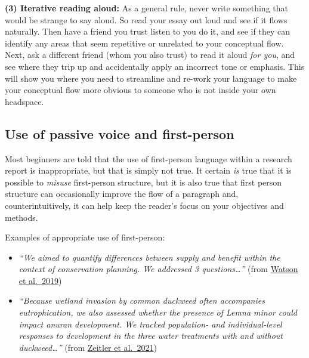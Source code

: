 \documentclass[
]{book}
\begin{document}
\textbf{(3) Iterative reading aloud:} As a general rule, never write something that would be strange to say aloud. So read your essay out loud and see if it flows naturally. Then have a friend you trust listen to you do it, and see if they can identify any areas that seem repetitive or unrelated to your conceptual flow. Next, ask a different friend (whom you also trust) to read it aloud \emph{for you}, and see where they trip up and accidentally apply an incorrect tone or emphasis. This will show you where you need to streamline and re-work your language to make your conceptual flow more obvious to someone who is not inside your own headspace.

\hypertarget{use-of-passive-voice-and-first-person}{%
\subsection*{Use of passive voice and first-person}\label{use-of-passive-voice-and-first-person}}

Most beginners are told that the use of first-person language within a research report is inappropriate, but that is simply not true. It certain \emph{is} true that it is possible to \emph{misuse} first-person structure, but it is also true that first person structure can occasionally improve the flow of a paragraph and, counterintuitively, it can help keep the reader's focus on your objectives and methods.

Examples of appropriate use of first-person:

\begin{itemize}
\item
  \emph{``We aimed to quantify differences between supply and benefit within the context of conservation planning. We addressed 3 questions\ldots{}''} (from \href{https://conbio.onlinelibrary.wiley.com/doi/full/10.1111/cobi.13276}{Watson et al.~2019})
\item
  \emph{``Because wetland invasion by common duckweed often accompanies eutrophication, we also assessed whether the presence of Lemna minor could impact anuran development. We tracked population- and individual-level responses to development in the three water treatments with and without duckweed\ldots{}''} (from \href{https://www.sciencedirect.com/science/article/pii/S0301479721006332?casa_token=BhsD4GiVQhIAAAAA:78wrLH-vN5gUPvNdX16fyaoHJq8QVQpQ-mqVA6UqxpxLMOFKweuX0YwJtBMLMnmVnfU4e1k}{Zeitler et al.~2021})
\end{itemize}
\end{document}
